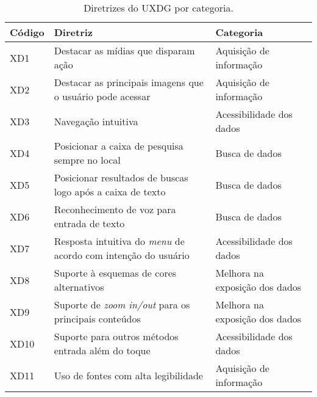 \begin{table}[htb]
  \begin{center}
    \ABNTEXfontereduzida
    \caption{Diretrizes do UXDG por categoria.}
    \label{tab-acc-dir-uxd-1}
    \begin{tabular}{p{1.0cm}|p{9.0cm}|p{4.5cm}}
      \textbf{Código} & \textbf{Diretriz}                                                   & \textbf{Categoria}             \\
      \hline
      XD1             & Destacar as mídias que disparam ação                                & Aquisição de informação        \\
      \hline
      XD2             & Destacar as principais imagens que o usuário pode acessar           & Aquisição de informação        \\
      \hline
      XD3             & Navegação intuitiva                                                 & Acessibilidade dos dados       \\
      \hline
      XD4             & Posicionar a caixa de pesquisa sempre no local                      & Busca de dados                 \\
      \hline
      XD5             & Posicionar resultados de buscas logo após a caixa de texto          & Busca de dados                 \\
      \hline
      XD6             & Reconhecimento de voz para entrada de texto                         & Busca de dados                 \\
      \hline
      XD7             & Resposta intuitiva do \emph{menu} de acordo com intenção do usuário & Acessibilidade dos dados       \\
      \hline
      XD8             & Suporte à esquemas de cores alternativos                            & Melhora na exposição dos dados \\
      \hline
      XD9             & Suporte de \emph{zoom in/out} para os principais conteúdos          & Melhora na exposição dos dados \\
      \hline
      XD10            & Suporte para outros métodos entrada além do toque                   & Acessibilidade dos dados       \\
      \hline
      XD11            & Uso de fontes com alta legibilidade                                 & Aquisição de informação        \\
    \end{tabular}
  \end{center}
\end{table}

